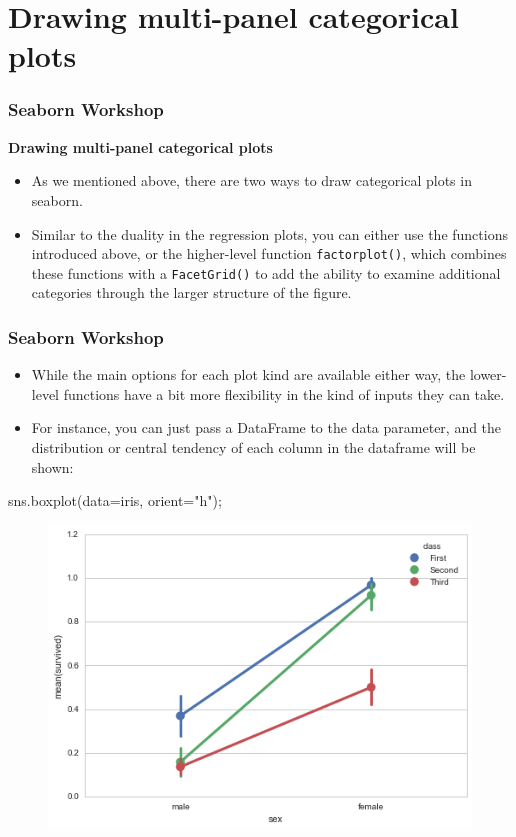 \documentclass{beamer}
\begin{document}
	
	\section{Drawing multi-panel categorical plots}
\begin{frame}[fragile]
\frametitle{Seaborn Workshop}
\large
\noindent \textbf{Drawing multi-panel categorical plots}
\begin{itemize}
\item As we mentioned above, there are two ways to draw categorical plots in seaborn. 
\item Similar to the duality in the regression plots, you can either use the functions introduced above, or the higher-level function \texttt{factorplot()}, which combines these functions with a \texttt{FacetGrid()} to add the ability to examine additional categories through the larger structure of the figure.
\end{itemize}

\end{frame}
\begin{frame}[fragile]
	\frametitle{Seaborn Workshop}
	\large
\begin{itemize}
\item While the main options for each plot kind are available either way, the lower-level functions have a bit more flexibility in the kind of inputs they can take.
\item For instance, you can just pass a DataFrame to the data parameter, and the distribution or central tendency of each column in the dataframe will be shown:
\end{itemize}


sns.boxplot(data=iris, orient="h");
\begin{figure}
\centering
\includegraphics[width=0.7\linewidth]{images/categorical_39_0}
\caption{}
\label{fig:categorical_39_0}
\end{figure}

\end{frame}
\end{document}
